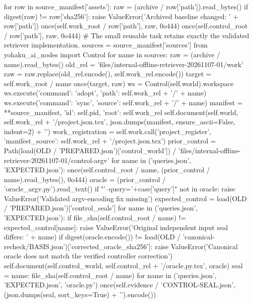         for row in source_manifest['assets']:
            raw = (archive / row['path']).read_bytes()
            if digest(raw) != row['sha256']:
                raise ValueError('Archived baseline changed: ' + row['path'])
            once(self.work_root / row['path'], raw, 0o444)
            once(self.control_root / row['path'], raw, 0o444)
        # The small reusable task retains exactly the validated retriever implementation.
        sources = source_manifest['sources']
        from yohaku_ai_nodes import Control
        for name in sources:
            raw = (archive / name).read_bytes()
            old_rel = 'files/internal-offline-retriever-20261107-01/work'
            raw = raw.replace(old_rel.encode(), self.work_rel.encode())
            target = self.work_root / name
            once(target, raw)
            ws = Control(self.world).workspace
            ws.execute({'command': 'adopt', 'path': self.work_rel + '/' + name})
            ws.execute({'command': 'sync', 'source': self.work_rel + '/' + name})
        manifest = {**source_manifest, 'id': self.pid, 'root': self.work_rel}
        self.document(self.world, self.work_rel + '/project.json.tex', json.dumps(manifest, ensure_ascii=False, indent=2) + '\n')
        work_registration = self.work.call('project_register', {'manifest_source': self.work_rel + '/project.json.tex'})
        prior_control = Path(load(OLD / 'PREPARED.json')['control_world']) / 'files/internal-offline-retriever-20261107-01/control-argv'
        for name in ('queries.json', 'EXPECTED.json'):
            once(self.control_root / name, (prior_control / name).read_bytes(), 0o444)
        oracle = (prior_control / 'oracle_argv.py').read_text()
        if "'--query='+case['query']" not in oracle:
            raise ValueError('Validated argv-encoding fix missing')
        expected_control = load(OLD / 'PREPARED.json')['control_seals']
        for name in ('queries.json', 'EXPECTED.json'):
            if file_sha(self.control_root / name) != expected_control[name]:
                raise ValueError('Original independent input seal differs: ' + name)
        if digest(oracle.encode()) != load(OLD / 'canonical-recheck/BASIS.json')['corrected_oracle_sha256']:
            raise ValueError('Canonical oracle does not match the verified controller correction')
        self.document(self.control_world, self.control_rel + '/oracle.py.tex', oracle)
        seal = {name: file_sha(self.control_root / name) for name in ('queries.json', 'EXPECTED.json', 'oracle.py')}
        once(self.evidence / 'CONTROL-SEAL.json', (json.dumps(seal, sort_keys=True) + '\n').encode())
